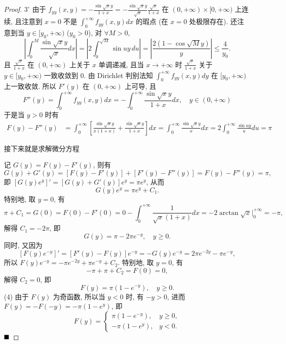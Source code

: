 \documentclass[lang=cn,newtx,10pt,scheme=chinese]{elegantbook}
\begin{document}
\begin{proof}
$3^\circ$ 由于 $f_{yy}(x,y) = -\frac{\sin\sqrt{x}y}{1+x} = -\frac{\sin\sqrt{x}y}{\sqrt{x}} \frac{\sqrt{x}}{1+x}$ 在 $(0, +\infty) \times [0, +\infty)$ 上连续,
且注意到 $x=0$ 不是 $\int_0^{+\infty} f_{yy}(x,y) dx$ 的瑕点 (在 $x=0$ 处极限存在).
还注意到当 $y \in [y_0, +\infty)$ ($y_0>0$), 对 $\forall M > 0$,
$$\left|\int_0^M \frac{\sin\sqrt{x}y}{\sqrt{x}} dx\right| = \left|2 \int_0^{\sqrt{M}} \sin uy \, du\right| = \left|\frac{2(1-\cos\sqrt{M}y)}{y}\right| \le \frac{4}{y_0}.$$
且 $\frac{\sqrt{x}}{1+x}$ 在 $(0, +\infty)$ 上关于 $x$ 单调递减, 且当 $x \to +\infty$ 时 $\frac{\sqrt{x}}{1+x}$ 关于 $y \in [y_0, +\infty)$ 一致收敛到 $0$. 由 Dirichlet 判别法知 $\int_0^{+\infty} f_{yy}(x,y) dy$ 在 $[y_0, +\infty)$ 上一致收敛.
所以 $F'(y)$ 在 $(0, +\infty)$ 上可导, 且
$$F''(y) = \int_0^{+\infty} f_{yy}(x,y) dx = -\int_0^{+\infty} \frac{\sin\sqrt{x}y}{1+x} dx, \quad y \in (0, +\infty)$$
于是当 $y > 0$ 时有
\begin{align*}
F(y) - F''(y) &= \int_0^{+\infty} \left[\frac{\sin\sqrt{x}y}{x(1+x)} + \frac{\sin\sqrt{x}y}{1+x}\right] dx = \int_0^{+\infty} \frac{\sin\sqrt{x}y}{x} dx = 2\int_0^{+\infty} \frac{\sin uy}{u} du = \pi
\end{align*}

接下来就是求解微分方程

记 $G(y) = F(y) - F'(y)$, 则有
$$ G(y) + G'(y) = [F(y) - F'(y)] + [F'(y) - F''(y)] = F(y) - F''(y) = \pi, $$
即 $[G(y)e^y]' = [G(y) + G'(y)]e^y = \pi e^y$, 从而
$$ G(y)e^y = \pi e^y + C_1. $$
特别地, 取 $y=0$, 有
$$ \pi + C_1 = G(0) = F(0) - F'(0) = 0 - \int_0^{+\infty} \frac{1}{\sqrt{x}(1+x)}dx = -2\arctan\sqrt{x}\Big|_0^{+\infty} = -\pi, $$
解得 $C_1 = -2\pi$, 即
$$ G(y) = \pi - 2\pi e^{-y}, \quad y \ge 0. $$
同时, 又因为
$$ [F(y)e^{-y}]' = [F'(y) - F(y)]e^{-y} = -G(y)e^{-y} = 2\pi e^{-2y} - \pi e^{-y}, $$
所以 $F(y)e^{-y} = -\pi e^{-2y} + \pi e^{-y} + C_2$. 特别地, 取 $y=0$, 有
$$ -\pi + \pi + C_2 = F(0) = 0, $$
解得 $C_2 = 0$, 即
$$ F(y) = \pi(1-e^{-y}), \quad y \ge 0. $$
(4) 由于 $F(y)$ 为奇函数, 所以当 $y < 0$ 时, 有 $-y > 0$, 进而 $F(y)=-F(-y) = -\pi(1-e^y)$, 即
$$ F(y) = \begin{cases} \pi(1-e^{-y}), & y \ge 0, \\ -\pi(1-e^y), & y < 0. \end{cases} $$
$\hfill \blacksquare$
\end{proof}
\end{document}
